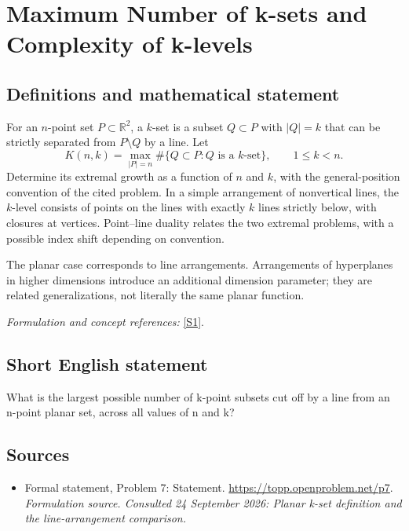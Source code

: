 \documentclass[11pt]{article}
\begin{document}
\section*{\texorpdfstring{Maximum Number of k-sets and Complexity of k-levels}{Maximum Number of k-sets and Complexity of k-levels}}\label{479}
\subsection{Definitions and mathematical statement}
For an $n$-point set $P\subset{\mathbb{R}}^2$, a $k$-set is a subset $Q\subset P$ with $|Q|=k$ that can be strictly separated from $P\setminus Q$ by a line. Let
\[
 K(n,k)=\max_{|P|=n}\#\{Q\subset P:Q\text{ is a }k\text{-set}
                                      \},\qquad1\le k<n.
\]
Determine its extremal growth as a function of $n$ and $k$, with the general-position convention of the cited problem. In a simple arrangement of nonvertical lines, the $k$-level consists of points on the lines with exactly $k$ lines strictly below, with closures at vertices. Point--line duality relates the two extremal problems, with a possible index shift depending on convention.

The planar case corresponds to line arrangements. Arrangements of hyperplanes in higher dimensions introduce an additional dimension parameter; they are related generalizations, not literally the same planar function.
\par\smallskip\textit{Formulation and concept references:} \href{https://topp.openproblem.net/p7}{[S1]}.

\subsection{Short English statement}
What is the largest possible number of k-point subsets cut off by a line from an n-point planar set, across all values of n and k?
\subsection{Sources}
\begin{itemize}
\item[S1]Formal statement, Problem 7: Statement.
\url{https://topp.openproblem.net/p7}.
\textit{Formulation source. Consulted 24 September 2026: Planar k-set definition and the line-arrangement comparison.}
\end{itemize}
\end{document}
